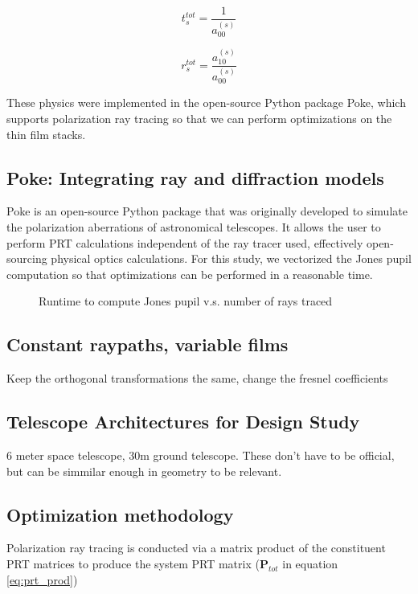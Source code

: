 \begin{equation}
    t_{s}^{tot} = \frac{1}{a_{00}^{(s)}}
\end{equation}

\begin{equation}
    r_{s}^{tot} = \frac{a_{10}^{(s)}}{a_{00}^{(s)}}
\end{equation}

These physics were implemented in the open-source Python package Poke, which supports polarization ray tracing so that we can perform optimizations on the thin film stacks.

\subsection{Poke: Integrating ray and diffraction models}
Poke is an open-source Python package that was originally developed to simulate the polarization aberrations of astronomical telescopes\cite{anche_gsmts}. It allows the user to perform PRT calculations independent of the ray tracer used, effectively open-sourcing physical optics calculations. For this study, we vectorized the Jones pupil computation so that optimizations can be performed in a reasonable time.

\begin{figure}
    \centering
    \caption{Runtime to compute Jones pupil v.s. number of rays traced}
    \label{fig:my_label}
\end{figure}

\subsection{Constant raypaths, variable films}
Keep the orthogonal transformations the same, change the fresnel coefficients

\subsection{Telescope Architectures for Design Study}
6 meter space telescope, 30m ground telescope. These don't have to be official, but can be simmilar enough in geometry to be relevant.

\subsection{Optimization methodology}
Polarization ray tracing is conducted via a matrix product of the constituent PRT matrices to produce the system PRT matrix ($\mathbf{P}_{tot}$ in equation \ref{eq:prt_prod})

